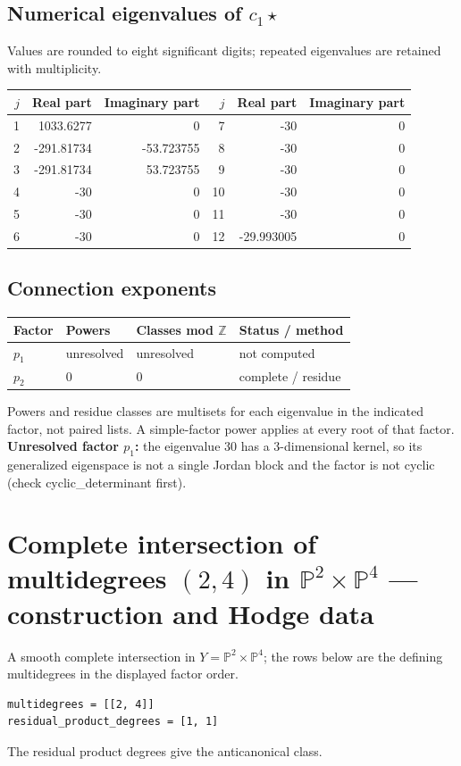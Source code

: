 \documentclass[10pt,a4paper]{article}
\begin{document}
\subsection*{Numerical eigenvalues of $c_1\star$}
Values are rounded to eight significant digits; repeated eigenvalues are retained with multiplicity.
\begin{center}\small\begin{tabular}{rrr@{\qquad}rrr}\toprule $j$ & Real part & Imaginary part & $j$ & Real part & Imaginary part\\\midrule
1 & 1033.6277 & 0 & 7 & -30 & 0\\
2 & -291.81734 & -53.723755 & 8 & -30 & 0\\
3 & -291.81734 & 53.723755 & 9 & -30 & 0\\
4 & -30 & 0 & 10 & -30 & 0\\
5 & -30 & 0 & 11 & -30 & 0\\
6 & -30 & 0 & 12 & -29.993005 & 0\\
\bottomrule\end{tabular}\end{center}
\subsection*{Connection exponents}
\begin{center}\begin{tabular}{llll}\toprule Factor & Powers & Classes mod $\mathbb Z$ & Status / method\\\midrule
$p_{1}$ & unresolved & unresolved & not computed\\
$p_{2}$ & $0$ & $0$ & complete / residue\\
\bottomrule\end{tabular}\end{center}
Powers and residue classes are multisets for each eigenvalue in the indicated factor, not paired lists. A simple-factor power applies at every root of that factor.
\textbf{Unresolved factor $p_{1}$:} the eigenvalue 30 has a 3-dimensional kernel, so its generalized eigenspace is not a single Jordan block and the factor is not cyclic (check cyclic\_determinant first).
\clearpage\section*{Complete intersection of multidegrees $(2,4)$ in $\mathbb P^{2}\times \mathbb P^{4}$ --- construction and Hodge data}\label{entry:PROD5-A03}
A smooth complete intersection in $Y=\mathbb P^{2}\times\mathbb P^{4}$; the rows below are the defining multidegrees in the displayed factor order.
\begin{lstlisting}
multidegrees = [[2, 4]]
residual_product_degrees = [1, 1]
\end{lstlisting}
The residual product degrees give the anticanonical class.
\end{document}
